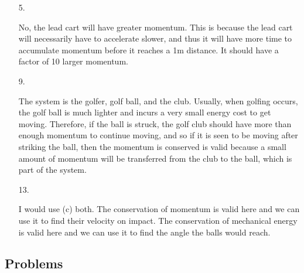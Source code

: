     \begin{itemize}
        \item [5.]
        
        No, the lead cart will have greater momentum. This is because the lead cart will necessarily have to accelerate slower, and thus it will have more time to accumulate momentum before it reaches a 1m distance. It should have a factor of 10 larger momentum.

        \item [9.]
        
        The system is the golfer, golf ball, and the club. Usually, when golfing occurs, the golf ball is much lighter and incurs a very small energy cost to get moving. Therefore, if the ball is struck, the golf club should have more than enough momentum to continue moving, and so if it is seen to be moving after striking the ball, then the momentum is conserved is valid because a small amount of momentum will be transferred from the club to the ball, which is part of the system.

        \item [13.]
        
        I would use (c) both. The conservation of momentum is valid here and we can use it to find their velocity on impact. The conservation of mechanical energy is valid here and we can use it to find the angle the balls would reach.

    \end{itemize}

    \subsection*{Problems}


